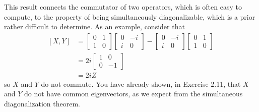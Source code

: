 This result connects the commutator of two operators, which is often easy to compute, to the property of being simultaneously diagonalizable, which is a prior rather difficult to determine. As an example, consider that
\begin{equation}
\begin{aligned}
{[X, Y] } & =\left[\begin{array}{ll}
0 & 1 \\
1 & 0
\end{array}\right]\left[\begin{array}{rr}
0 & -i \\
i & 0
\end{array}\right]-\left[\begin{array}{rr}
0 & -i \\
i & 0
\end{array}\right]\left[\begin{array}{ll}
0 & 1 \\
1 & 0
\end{array}\right] \\
& =2 i\left[\begin{array}{rr}
1 & 0 \\
0 & -1
\end{array}\right] \\
& =2 i Z
\end{aligned}
\end{equation}
so $X$ and $Y$ do not commute. You have already shown, in Exercise 2.11, that $X$ and $Y$ do not have common eigenvectors, as we expect from the simultaneous diagonalization theorem.

